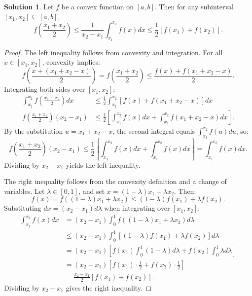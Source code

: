 \documentclass[12pt]{article}
\theoremstyle{definition}
\newtheorem*{solution}{\normalfont\textbf{Solution}}
\begin{document}
\begin{enumerate}[leftmargin=*]
\begin{solution}
            Let \(f\) be a convex function on \([a, b]\). Then for any subinterval \([x_1, x_2] \subseteq [a, b]\), 
            \[
            f\left( \frac{x_1 + x_2}{2} \right) \leq \frac{1}{x_2 - x_1} \int_{x_1}^{x_2} f(x)  dx \leq \frac{1}{2} \left[ f(x_1) + f(x_2) \right].
            \]

            \begin{proof}
                The left inequality follows from convexity and integration. For all \(x \in [x_1, x_2]\), convexity implies:
                \[
                f\left( \frac{x + (x_1 + x_2 - x)}{2} \right) = f\left( \frac{x_1 + x_2}{2} \right) \leq \frac{f(x) + f(x_1 + x_2 - x)}{2}.
                \]
                Integrating both sides over \([x_1, x_2]\):
                \begin{align*}
                \int_{x_1}^{x_2} f\left( \frac{x_1 + x_2}{2} \right)  dx &\leq \frac{1}{2} \int_{x_1}^{x_2} \left[ f(x) + f(x_1 + x_2 - x) \right]  dx \\
                f\left( \frac{x_1 + x_2}{2} \right) (x_2 - x_1) &\leq \frac{1}{2} \left[ \int_{x_1}^{x_2} f(x)  dx + \int_{x_1}^{x_2} f(x_1 + x_2 - x)  dx \right].
                \end{align*}
                By the substitution \(u = x_1 + x_2 - x\), the second integral equals \(\int_{x_1}^{x_2} f(u)  du\), so:
                \[
                f\left( \frac{x_1 + x_2}{2} \right) (x_2 - x_1) \leq \frac{1}{2} \left[ \int_{x_1}^{x_2} f(x)  dx + \int_{x_1}^{x_2} f(x)  dx \right] = \int_{x_1}^{x_2} f(x)  dx.
                \]
                Dividing by \(x_2 - x_1\) yields the left inequality.

                The right inequality follows from the convexity definition and a change of variables. Let \(\lambda \in [0, 1]\), and set \(x = (1 - \lambda) x_1 + \lambda x_2\). Then:
                \[
                f(x) = f((1 - \lambda) x_1 + \lambda x_2) \leq (1 - \lambda) f(x_1) + \lambda f(x_2).
                \]
                Substituting \(dx = (x_2 - x_1)  d\lambda\) when integrating over \([x_1, x_2]\):
                \begin{align*}
                \int_{x_1}^{x_2} f(x)  dx &= (x_2 - x_1) \int_{0}^{1} f((1 - \lambda) x_1 + \lambda x_2)  d\lambda \\
                &\leq (x_2 - x_1) \int_{0}^{1} \left[ (1 - \lambda) f(x_1) + \lambda f(x_2) \right]  d\lambda \\
                &= (x_2 - x_1) \left[ f(x_1) \int_{0}^{1} (1 - \lambda)  d\lambda + f(x_2) \int_{0}^{1} \lambda  d\lambda \right] \\
                &= (x_2 - x_1) \left[ f(x_1) \cdot \frac{1}{2} + f(x_2) \cdot \frac{1}{2} \right] \\
                &= \frac{x_2 - x_1}{2} \left[ f(x_1) + f(x_2) \right].
                \end{align*}
                Dividing by \(x_2 - x_1\) gives the right inequality.


\end{proof}
\end{solution}
\end{enumerate}
\end{document}
